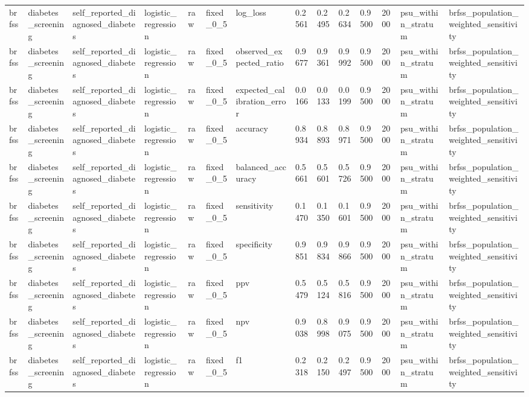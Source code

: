 \begin{tabular}{llllllllllllll}
brfss & diabetes\_screening & self\_reported\_diagnosed\_diabetes & logistic\_regression & raw & fixed\_0\_5 & log\_loss & 0.2561 & 0.2495 & 0.2634 & 0.9500 & 2000 & psu\_within\_stratum & brfss\_population\_weighted\_sensitivity \\
brfss & diabetes\_screening & self\_reported\_diagnosed\_diabetes & logistic\_regression & raw & fixed\_0\_5 & observed\_expected\_ratio & 0.9677 & 0.9361 & 0.9992 & 0.9500 & 2000 & psu\_within\_stratum & brfss\_population\_weighted\_sensitivity \\
brfss & diabetes\_screening & self\_reported\_diagnosed\_diabetes & logistic\_regression & raw & fixed\_0\_5 & expected\_calibration\_error & 0.0166 & 0.0133 & 0.0199 & 0.9500 & 2000 & psu\_within\_stratum & brfss\_population\_weighted\_sensitivity \\
brfss & diabetes\_screening & self\_reported\_diagnosed\_diabetes & logistic\_regression & raw & fixed\_0\_5 & accuracy & 0.8934 & 0.8893 & 0.8971 & 0.9500 & 2000 & psu\_within\_stratum & brfss\_population\_weighted\_sensitivity \\
brfss & diabetes\_screening & self\_reported\_diagnosed\_diabetes & logistic\_regression & raw & fixed\_0\_5 & balanced\_accuracy & 0.5661 & 0.5601 & 0.5726 & 0.9500 & 2000 & psu\_within\_stratum & brfss\_population\_weighted\_sensitivity \\
brfss & diabetes\_screening & self\_reported\_diagnosed\_diabetes & logistic\_regression & raw & fixed\_0\_5 & sensitivity & 0.1470 & 0.1350 & 0.1601 & 0.9500 & 2000 & psu\_within\_stratum & brfss\_population\_weighted\_sensitivity \\
brfss & diabetes\_screening & self\_reported\_diagnosed\_diabetes & logistic\_regression & raw & fixed\_0\_5 & specificity & 0.9851 & 0.9834 & 0.9866 & 0.9500 & 2000 & psu\_within\_stratum & brfss\_population\_weighted\_sensitivity \\
brfss & diabetes\_screening & self\_reported\_diagnosed\_diabetes & logistic\_regression & raw & fixed\_0\_5 & ppv & 0.5479 & 0.5124 & 0.5816 & 0.9500 & 2000 & psu\_within\_stratum & brfss\_population\_weighted\_sensitivity \\
brfss & diabetes\_screening & self\_reported\_diagnosed\_diabetes & logistic\_regression & raw & fixed\_0\_5 & npv & 0.9038 & 0.8998 & 0.9075 & 0.9500 & 2000 & psu\_within\_stratum & brfss\_population\_weighted\_sensitivity \\
brfss & diabetes\_screening & self\_reported\_diagnosed\_diabetes & logistic\_regression & raw & fixed\_0\_5 & f1 & 0.2318 & 0.2150 & 0.2497 & 0.9500 & 2000 & psu\_within\_stratum & brfss\_population\_weighted\_sensitivity \\

\end{tabular}
